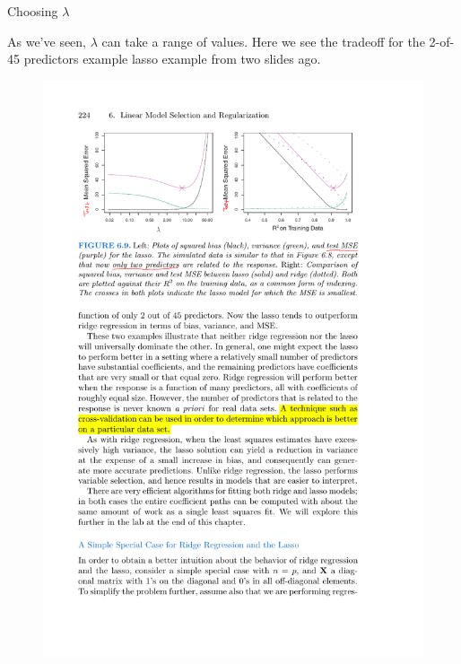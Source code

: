 \documentclass[mathserif]{beamer}
\begin{document}
\begin{frame}{Choosing $\lambda$}

As we've seen, $\lambda$ can take a range of values.  Here we see the tradeoff for the 2-of-45 predictors example  lasso example from two slides ago. 


\begin{figure}
\includegraphics[scale=.7]{bias-variance-lasso-2}

\end{figure}
\end{frame}
\end{document}
